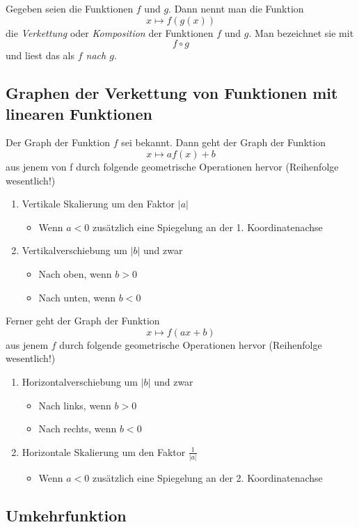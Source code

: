 \documentclass[10pt,a4paper]{article}
\begin{document}
Gegeben seien die Funktionen $f$ und $g$. Dann nennt man die Funktion
$$x \mapsto f(g(x))$$
die \textit{Verkettung} oder \textit{Komposition} der Funktionen $f$ und $g$. Man bezeichnet sie mit
$$f \circ g$$
und liest das als \textit{$f$ nach $g$}.


\subsection{Graphen der Verkettung von Funktionen mit linearen Funktionen}

Der Graph der Funktion $f$ sei bekannt. Dann geht der Graph der Funktion
$$x \mapsto af(x) + b$$
aus jenem von f durch folgende geometrische Operationen hervor (Reihenfolge wesentlich!)
\begin{enumerate}
	\item Vertikale Skalierung um den Faktor $|a|$
	\begin{itemize}
		\item Wenn $a < 0$ zusätzlich eine Spiegelung an der 1. Koordinatenachse
	\end{itemize}
	\item Vertikalverschiebung um $|b|$ und zwar
	\begin{itemize}
		\item Nach oben, wenn $b > 0$
		\item Nach unten, wenn $b < 0$
	\end{itemize}
\end{enumerate}

Ferner geht der Graph der Funktion
$$x \mapsto f(ax + b)$$
aus jenem $f$ durch folgende geometrische Operationen hervor (Reihenfolge wesentlich!)
\begin{enumerate}
	\item Horizontalverschiebung um $|b|$ und zwar
	\begin{itemize}
		\item Nach links, wenn $b > 0$
		\item Nach rechts, wenn $b < 0$
	\end{itemize}
	\item Horizontale Skalierung um den Faktor $\displaystyle\frac{1}{|a|}$
	\begin{itemize}
		\item Wenn $a < 0$ zusätzlich eine Spiegelung an der 2. Koordinatenachse	
	\end{itemize}
\end{enumerate}


\subsection{Umkehrfunktion}
\end{document}
